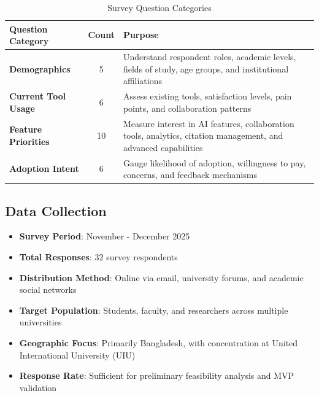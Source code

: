 \begin{table}[H]
    \centering
    \begin{tabularx}{\textwidth}{|l|c|X|}
        \hline
        \textbf{Question Category}  & \textbf{Count} & \textbf{Purpose}                                                 \\
        \hline
        \textbf{Demographics}       & 5              &
        Understand respondent roles, academic levels, fields of study, age groups, and institutional affiliations       \\
        \hline
        \textbf{Current Tool Usage} & 6              &
        Assess existing tools, satisfaction levels, pain points, and collaboration patterns                             \\
        \hline
        \textbf{Feature Priorities} & 10             &
        Measure interest in AI features, collaboration tools, analytics, citation management, and advanced capabilities \\
        \hline
        \textbf{Adoption Intent}    & 6              &
        Gauge likelihood of adoption, willingness to pay, concerns, and feedback mechanisms                             \\
        \hline
    \end{tabularx}
    \caption{Survey Question Categories}
    \label{table:survey-categories}
\end{table}

\subsection{Data Collection}

\begin{itemize}[leftmargin=*]
    \item \textbf{Survey Period}: November - December 2025
    \item \textbf{Total Responses}: 32 survey respondents
    \item \textbf{Distribution Method}: Online via email, university forums, and academic social networks
    \item \textbf{Target Population}: Students, faculty, and researchers across multiple universities
    \item \textbf{Geographic Focus}: Primarily Bangladesh, with concentration at United International University (UIU)
    \item \textbf{Response Rate}: Sufficient for preliminary feasibility analysis and MVP validation
\end{itemize}

